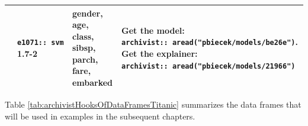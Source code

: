 \documentclass[]{krantz}
\begin{document}
\begin{longtable}[]{@{}llll@{}}
\begin{minipage}[t]{0.21\columnwidth}
\end{minipage} & \begin{minipage}[t]{0.25\columnwidth}\raggedright
\texttt{e1071::\ svm} 1.7-2\strut
\end{minipage} & \begin{minipage}[t]{0.18\columnwidth}\raggedright
gender, age, class, sibsp, parch, fare, embarked\strut
\end{minipage} & \begin{minipage}[t]{0.25\columnwidth}\raggedright
Get the model: \texttt{archivist::\ aread("pbiecek/models/be26e")}. Get the explainer: \texttt{archivist::\ aread("pbiecek/models/21966")}\strut
\end{minipage}\tabularnewline
\bottomrule
\end{longtable}

Table \ref{tab:archivistHooksOfDataFramesTitanic} summarizes the data frames that will be used in examples in the subsequent chapters.
\end{document}

